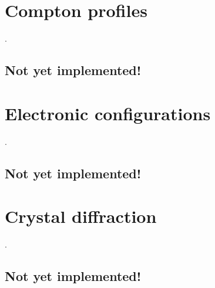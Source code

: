 \documentclass[letterpaper,10pt,english,openany,oneside]{sphinxmanual}
\begin{document}
\sphinxstepscope


\section{Compton profiles}
\label{\detokenize{api/compton_profiles:compton-profiles}}\label{\detokenize{api/compton_profiles::doc}}
\sphinxAtStartPar
{}.


\subsection{Not yet implemented!}
\label{\detokenize{api/compton_profiles:not-yet-implemented}}
\sphinxstepscope


\section{Electronic configurations}
\label{\detokenize{api/electronic_configurations:electronic-configurations}}\label{\detokenize{api/electronic_configurations::doc}}
\sphinxAtStartPar
{}.


\subsection{Not yet implemented!}
\label{\detokenize{api/electronic_configurations:not-yet-implemented}}
\sphinxstepscope


\section{Crystal diffraction}
\label{\detokenize{api/crystal_diffraction:crystal-diffraction}}\label{\detokenize{api/crystal_diffraction::doc}}
\sphinxAtStartPar
{}.


\subsection{Not yet implemented!}
\label{\detokenize{api/crystal_diffraction:not-yet-implemented}}
\sphinxstepscope
\end{document}
